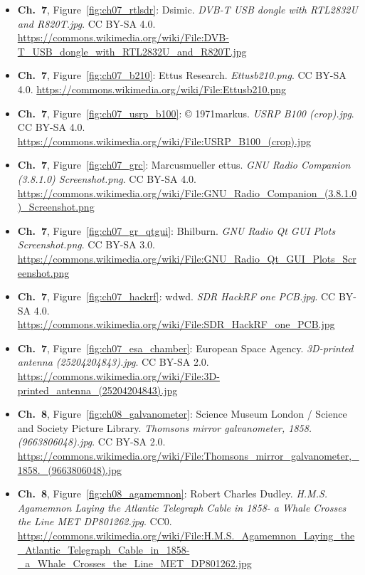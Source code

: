 \begin{small}
\begin{itemize}[leftmargin=0pt,itemsep=2pt,label={}]
\item \textbf{Ch.~7}, Figure~\ref{fig:ch07_rtlsdr}: Dsimic. \emph{DVB-\allowbreak{}T USB dongle with RTL2832U and R820T.\allowbreak{}jpg}. CC BY-SA 4.0. \url{https://commons.wikimedia.org/wiki/File:DVB-T_USB_dongle_with_RTL2832U_and_R820T.jpg}
\item \textbf{Ch.~7}, Figure~\ref{fig:ch07_b210}: Ettus Research. \emph{Ettusb210.\allowbreak{}png}. CC BY-SA 4.0. \url{https://commons.wikimedia.org/wiki/File:Ettusb210.png}
\item \textbf{Ch.~7}, Figure~\ref{fig:ch07_usrp_b100}: © 1971markus. \emph{USRP B100 (crop).\allowbreak{}jpg}. CC BY-SA 4.0. \url{https://commons.wikimedia.org/wiki/File:USRP_B100_(crop).jpg}
\item \textbf{Ch.~7}, Figure~\ref{fig:ch07_grc}: Marcusmueller ettus. \emph{GNU Radio Companion (3.\allowbreak{}8.\allowbreak{}1.\allowbreak{}0) Screenshot.\allowbreak{}png}. CC BY-SA 4.0. \url{https://commons.wikimedia.org/wiki/File:GNU_Radio_Companion_(3.8.1.0)_Screenshot.png}
\item \textbf{Ch.~7}, Figure~\ref{fig:ch07_gr_qtgui}: Bhilburn. \emph{GNU Radio Qt GUI Plots Screenshot.\allowbreak{}png}. CC BY-SA 3.0. \url{https://commons.wikimedia.org/wiki/File:GNU_Radio_Qt_GUI_Plots_Screenshot.png}
\item \textbf{Ch.~7}, Figure~\ref{fig:ch07_hackrf}: wdwd. \emph{SDR HackRF one PCB.\allowbreak{}jpg}. CC BY-SA 4.0. \url{https://commons.wikimedia.org/wiki/File:SDR_HackRF_one_PCB.jpg}
\item \textbf{Ch.~7}, Figure~\ref{fig:ch07_esa_chamber}: European Space Agency. \emph{3D-\allowbreak{}printed antenna (25204204843).\allowbreak{}jpg}. CC BY-SA 2.0. \url{https://commons.wikimedia.org/wiki/File:3D-printed_antenna_(25204204843).jpg}
\item \textbf{Ch.~8}, Figure~\ref{fig:ch08_galvanometer}: Science Museum London / Science and Society Picture Library. \emph{Thomsons mirror galvanometer, 1858.\allowbreak{} (9663806048).\allowbreak{}jpg}. CC BY-SA 2.0. \url{https://commons.wikimedia.org/wiki/File:Thomsons_mirror_galvanometer,_1858._(9663806048).jpg}
\item \textbf{Ch.~8}, Figure~\ref{fig:ch08_agamemnon}: Robert Charles Dudley. \emph{H.\allowbreak{}M.\allowbreak{}S.\allowbreak{} Agamemnon Laying the Atlantic Telegraph Cable in 1858-\allowbreak{} a Whale Crosses the Line MET DP801262.\allowbreak{}jpg}. CC0. \url{https://commons.wikimedia.org/wiki/File:H.M.S._Agamemnon_Laying_the_Atlantic_Telegraph_Cable_in_1858-_a_Whale_Crosses_the_Line_MET_DP801262.jpg}

\end{itemize}
\end{small}
